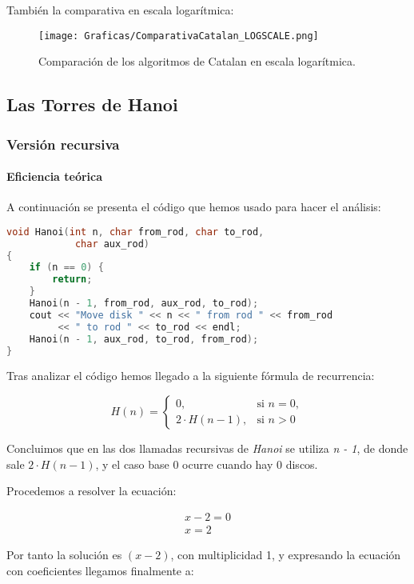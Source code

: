 \documentclass[a4paper,12pt]{article} %
\begin{document}
También la comparativa en escala logarítmica:

\begin{figure}[H]
	\centering
	\texttt{[image: Graficas/ComparativaCatalan\_LOGSCALE.png]}
	\caption{Comparación de los algoritmos de Catalan en escala logarítmica.}
\end{figure}

\subsection{Las Torres de Hanoi}

\subsubsection{Versión recursiva}
\paragraph{Eficiencia teórica}

A continuación se presenta el código que hemos usado para hacer el análisis:

\begin{lstlisting}[language=C, caption={Código de Hanoi recursivo}]
void Hanoi(int n, char from_rod, char to_rod,
            char aux_rod)
{
    if (n == 0) {
        return;
    }
    Hanoi(n - 1, from_rod, aux_rod, to_rod);
    cout << "Move disk " << n << " from rod " << from_rod
         << " to rod " << to_rod << endl;
    Hanoi(n - 1, aux_rod, to_rod, from_rod);
}
\end{lstlisting}

Tras analizar el código hemos llegado a la siguiente fórmula de recurrencia:

\[
	H(n)=
	\begin{cases}
		0,             & \text{si } n = 0, \\[6pt]
		2\cdot H(n-1), & \text{si } n > 0
	\end{cases}
\]

Concluimos que en las dos llamadas recursivas de \textit{Hanoi}
se utiliza \textit{n - 1}, de donde sale $2\cdot H(n-1)$, y el caso base
0 ocurre cuando hay 0 discos.

Procedemos a resolver la ecuación:

\begin{align*}
	x - 2 = 0 \\
	x = 2
\end{align*}

Por tanto la solución es $(x -2)$, con multiplicidad 1, y expresando la
ecuación con coeficientes llegamos finalmente a:
\end{document}
